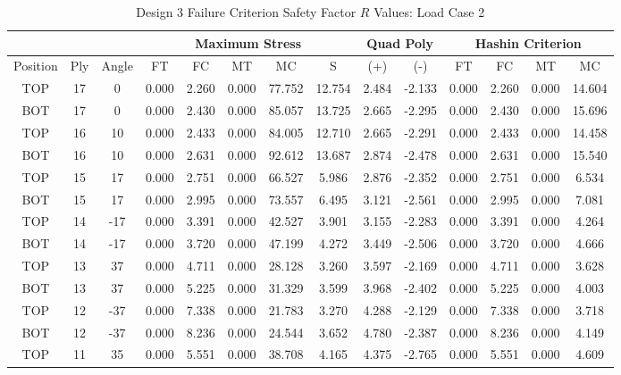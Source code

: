 \begin{landscape}
\begin{table}
\centering
\caption{Design 3 Failure Criterion Safety Factor $R$ Values: Load Case 2}
\label{tab:q3r2}
\begin{tabular}{|ccc|ccccc|cc|cccc|}
\toprule
 & & & \multicolumn{5}{|c|}{Maximum Stress} & \multicolumn{2}{|c|}{Quad Poly} & \multicolumn{4}{|c|}{Hashin Criterion} \\
\midrule
Position & Ply & Angle & FT & FC & MT & MC & S & (+) & (-) & FT & FC & MT & MC \\
\midrule
TOP  & 17 &   0 &   0.000 &   2.260 &   0.000 &  77.752 & 12.754 & 2.484 & -2.133 &    0.000 &    2.260 &    0.000 &   14.604 \\
BOT  & 17 &   0 &   0.000 &   2.430 &   0.000 &  85.057 & 13.725 & 2.665 & -2.295 &    0.000 &    2.430 &    0.000 &   15.696 \\
TOP & 16 &  10 &   0.000 &   2.433 &   0.000 &  84.005 & 12.710 & 2.665 & -2.291 &    0.000 &    2.433 &    0.000 &   14.458 \\
BOT  & 16 &  10 &   0.000 &   2.631 &   0.000 &  92.612 & 13.687 & 2.874 & -2.478 &    0.000 &    2.631 &    0.000 &   15.540 \\
TOP & 15 &  17 &   0.000 &   2.751 &   0.000 &  66.527 &  5.986 & 2.876 & -2.352 &    0.000 &    2.751 &    0.000 &    6.534 \\
BOT  & 15 &  17 &   0.000 &   2.995 &   0.000 &  73.557 &  6.495 & 3.121 & -2.561 &    0.000 &    2.995 &    0.000 &    7.081 \\
TOP  & 14 & -17 &   0.000 &   3.391 &   0.000 &  42.527 &  3.901 & 3.155 & -2.283 &    0.000 &    3.391 &    0.000 &    4.264 \\
BOT & 14 & -17 &   0.000 &   3.720 &   0.000 &  47.199 &  4.272 & 3.449 & -2.506 &    0.000 &    3.720 &    0.000 &    4.666 \\
TOP & 13 &  37 &   0.000 &   4.711 &   0.000 &  28.128 &  3.260 & 3.597 & -2.169 &    0.000 &    4.711 &    0.000 &    3.628 \\
BOT  & 13 &  37 &   0.000 &   5.225 &   0.000 &  31.329 &  3.599 & 3.968 & -2.402 &    0.000 &    5.225 &    0.000 &    4.003 \\
TOP & 12 & -37 &   0.000 &   7.338 &   0.000 &  21.783 &  3.270 & 4.288 & -2.129 &    0.000 &    7.338 &    0.000 &    3.718 \\
BOT & 12 & -37 &   0.000 &   8.236 &   0.000 &  24.544 &  3.652 & 4.780 & -2.387 &    0.000 &    8.236 &    0.000 &    4.149 \\
TOP & 11 &  35 &   0.000 &   5.551 &   0.000 &  38.708 &  4.165 & 4.375 & -2.765 &    0.000 &    5.551 &    0.000 &    4.609 \\

\end{tabular}
\end{table}
\end{landscape}

